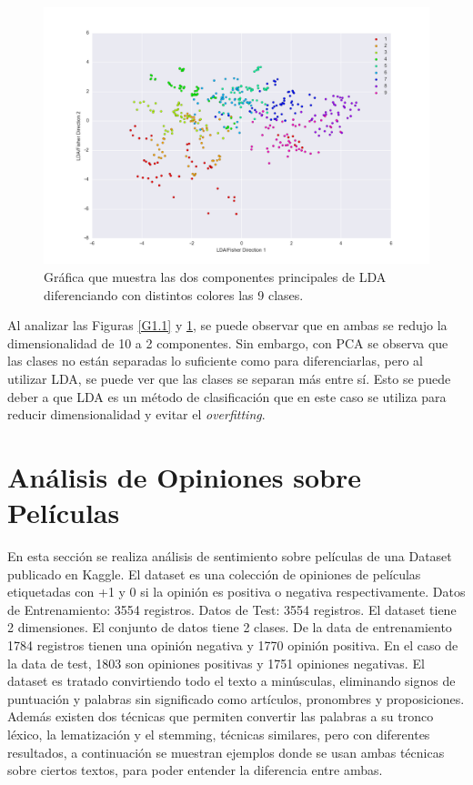 \documentclass[letter, 10pt]{article}
\begin{document}
\begin{figure}[h]
\begin{center}
\includegraphics[width=1\textwidth]{Images/figure_2.png}
\caption{Gráfica que muestra las dos componentes principales de LDA diferenciando con distintos colores las 9 clases.}
\label{G1.2}
\end{center}
\end{figure}

Al analizar las Figuras \ref{G1.1} y \ref{G1.2}, se puede observar que en ambas se redujo la dimensionalidad de 10 a 2 componentes. Sin embargo, con PCA se observa que las clases no están separadas lo suficiente como para diferenciarlas, pero al utilizar LDA, se puede ver que las clases se separan más entre sí. Esto se puede deber a que LDA es un método de clasificación que en este caso se utiliza para reducir dimensionalidad y evitar el \textit{overfitting}.

\section{Análisis de Opiniones sobre Películas}

En esta sección se realiza análisis de sentimiento sobre películas de una Dataset publicado en Kaggle. El dataset es una colección de opiniones de películas etiquetadas con +1 y 0 si la opinión es positiva o negativa respectivamente. 
Datos de Entrenamiento: 3554 registros.
Datos de Test: 3554 registros.
El dataset tiene 2 dimensiones.
El conjunto de datos tiene 2 clases.
De la data de entrenamiento 1784 registros tienen una opinión negativa y 1770 opinión positiva. En el caso de la data de test, 1803 son opiniones positivas y 1751 opiniones negativas. El dataset es tratado convirtiendo todo el texto a minúsculas, eliminando signos de puntuación y palabras sin significado como artículos, pronombres y proposiciones. Además existen dos técnicas que permiten convertir las palabras a su tronco léxico, la lematización y el stemming, técnicas similares, pero con diferentes resultados, a continuación se muestran ejemplos donde se usan ambas técnicas sobre ciertos textos, para poder entender la diferencia entre ambas.\\
\end{document}
